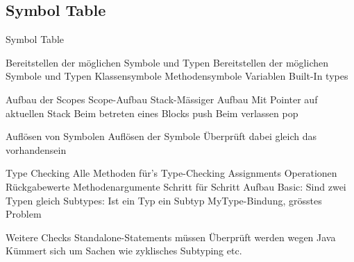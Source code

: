 \subsection{Symbol Table}
\begin{frame}[t]{Symbol Table}
	\begin{bigitemize}[<+->]{3mm}
		\item Bereitstellen der möglichen Symbole und Typen
		 {Bereitstellen der möglichen Symbole und Typen}
		 {Klassensymbole}
		 {Methodensymbole}
		 {Variablen}
		 {Built-In types}

		\item Aufbau der Scopes 
		 {Scope-Aufbau}
		 {Stack-Mässiger Aufbau}
		 {Mit Pointer auf aktuellen Stack}
		 {Beim betreten eines Blocks push}
		 {Beim verlassen pop}

		\item Auflösen von Symbolen
		 {Auflösen der Symbole}
		 {Überprüft dabei gleich das vorhandensein}

		\item Type Checking
		 {Alle Methoden für's Type-Checking}
		 {Assignments} 
		 {Operationen} 
		 {Rückgabewerte} 
		 {Methodenargumente}
		 {Schritt für Schritt Aufbau}
		 {Basic: Sind zwei Typen gleich}
		 {Subtypes: Ist ein Typ ein Subtyp}
		 {MyType-Bindung, grösstes Problem}

		\item Weitere Checks
		 {Standalone-Statements müssen Überprüft werden wegen Java}
		 {Kümmert sich um Sachen wie zyklisches Subtyping etc.}
	\end{bigitemize}
\end{frame}

